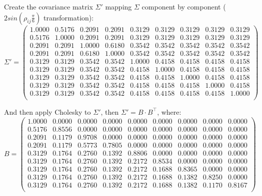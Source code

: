 \documentclass[a4paper,12pt,final]{article}
\begin{document}
Create the covariance matrix $\Sigma'$ mapping $\Sigma$ component 
by component ($2 sin(\rho_{ij} \frac{\pi}{6})$ transformation):
{\small
\begin{displaymath}
\Sigma' = 
\left( 
\begin{array}{ccccccccc}
   1.0000 & 0.5176 & 0.2091 & 0.2091 & 0.3129 & 0.3129 & 0.3129 & 0.3129 & 0.3129 \\
   0.5176 & 1.0000 & 0.2091 & 0.2091 & 0.3129 & 0.3129 & 0.3129 & 0.3129 & 0.3129 \\
   0.2091 & 0.2091 & 1.0000 & 0.6180 & 0.3542 & 0.3542 & 0.3542 & 0.3542 & 0.3542 \\
   0.2091 & 0.2091 & 0.6180 & 1.0000 & 0.3542 & 0.3542 & 0.3542 & 0.3542 & 0.3542 \\
   0.3129 & 0.3129 & 0.3542 & 0.3542 & 1.0000 & 0.4158 & 0.4158 & 0.4158 & 0.4158 \\
   0.3129 & 0.3129 & 0.3542 & 0.3542 & 0.4158 & 1.0000 & 0.4158 & 0.4158 & 0.4158 \\
   0.3129 & 0.3129 & 0.3542 & 0.3542 & 0.4158 & 0.4158 & 1.0000 & 0.4158 & 0.4158 \\
   0.3129 & 0.3129 & 0.3542 & 0.3542 & 0.4158 & 0.4158 & 0.4158 & 1.0000 & 0.4158 \\
   0.3129 & 0.3129 & 0.3542 & 0.3542 & 0.4158 & 0.4158 & 0.4158 & 0.4158 & 1.0000 \\
\end{array}
\right)
\end{displaymath}
}

And then apply Cholesky to $\Sigma'$, then $\Sigma' = B \cdot B^{\top}$, 
where:
{\small
\begin{displaymath}
B = 
\left(
\begin{array}{ccccccccc}
   1.0000 & 0.0000 & 0.0000 & 0.0000 & 0.0000 & 0.0000 & 0.0000 & 0.0000 & 0.0000 \\
   0.5176 & 0.8556 & 0.0000 & 0.0000 & 0.0000 & 0.0000 & 0.0000 & 0.0000 & 0.0000 \\
   0.2091 & 0.1179 & 0.9708 & 0.0000 & 0.0000 & 0.0000 & 0.0000 & 0.0000 & 0.0000 \\
   0.2091 & 0.1179 & 0.5773 & 0.7805 & 0.0000 & 0.0000 & 0.0000 & 0.0000 & 0.0000 \\
   0.3129 & 0.1764 & 0.2760 & 0.1392 & 0.8806 & 0.0000 & 0.0000 & 0.0000 & 0.0000 \\
   0.3129 & 0.1764 & 0.2760 & 0.1392 & 0.2172 & 0.8534 & 0.0000 & 0.0000 & 0.0000 \\
   0.3129 & 0.1764 & 0.2760 & 0.1392 & 0.2172 & 0.1688 & 0.8365 & 0.0000 & 0.0000 \\
   0.3129 & 0.1764 & 0.2760 & 0.1392 & 0.2172 & 0.1688 & 0.1382 & 0.8250 & 0.0000 \\
   0.3129 & 0.1764 & 0.2760 & 0.1392 & 0.2172 & 0.1688 & 0.1382 & 0.1170 & 0.8167 \\
\end{array}
\right)
\end{displaymath}
}
\end{document}
